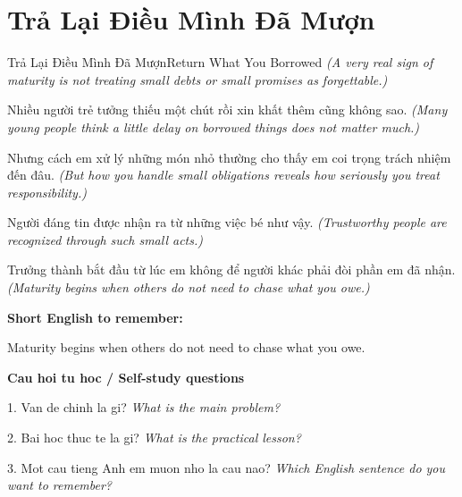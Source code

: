 \section{Trả Lại Điều Mình Đã Mượn}
\begin{truyen}{Trả Lại Điều Mình Đã Mượn}{Return What You Borrowed}
\textit{(A very real sign of maturity is not treating small debts or small promises as forgettable.)}

Nhiều người trẻ tưởng thiếu một chút rồi xin khất thêm cũng không sao.
\textit{(Many young people think a little delay on borrowed things does not matter much.)}

Nhưng cách em xử lý những món nhỏ thường cho thấy em coi trọng trách nhiệm đến đâu.
\textit{(But how you handle small obligations reveals how seriously you treat responsibility.)}

Người đáng tin được nhận ra từ những việc bé như vậy.
\textit{(Trustworthy people are recognized through such small acts.)}

\end{truyen}

\begin{baihoc}
Trưởng thành bắt đầu từ lúc em không để người khác phải đòi phần em đã nhận.
\textit{(Maturity begins when others do not need to chase what you owe.)}
\end{baihoc}

\begin{ghinhoanh}
\textbf{Short English to remember:}

Maturity begins when others do not need to chase what you owe.

\end{ghinhoanh}

\begin{tuhocnhanh}
\textbf{Cau hoi tu hoc / Self-study questions}

1. Van de chinh la gi? \textit{What is the main problem?}

2. Bai hoc thuc te la gi? \textit{What is the practical lesson?}

3. Mot cau tieng Anh em muon nho la cau nao? \textit{Which English sentence do you want to remember?}
\end{tuhocnhanh}
\ngancach


